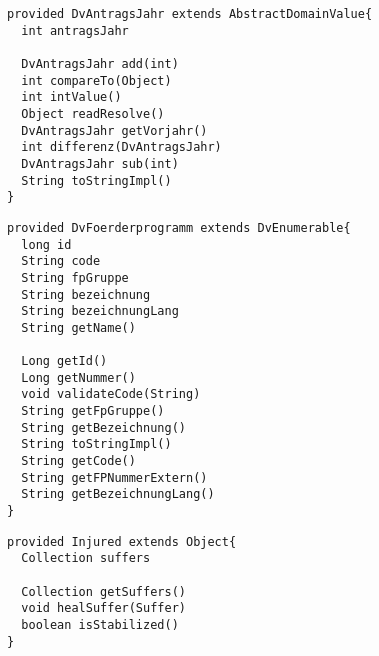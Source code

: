 \begin{lstlisting}[style = dsl, caption = Deklartion von DvAntragsJahr, captionpos = b, label = lst_dvantragsjahr]
provided DvAntragsJahr extends AbstractDomainValue{
  int antragsJahr
  
  DvAntragsJahr add(int)
  int compareTo(Object)
  int intValue()
  Object readResolve()
  DvAntragsJahr getVorjahr()
  int differenz(DvAntragsJahr)
  DvAntragsJahr sub(int)
  String toStringImpl()
}
\end{lstlisting}
\begin{lstlisting}[style = dsl, caption = Deklartion von DvFoerderprogramm, captionpos = b, label = lst_DvFoerderprogramm]
provided DvFoerderprogramm extends DvEnumerable{
  long id
  String code
  String fpGruppe
  String bezeichnung
  String bezeichnungLang
  String getName()
  
  Long getId()
  Long getNummer()
  void validateCode(String)
  String getFpGruppe()
  String getBezeichnung()
  String toStringImpl()
  String getCode()
  String getFPNummerExtern()
  String getBezeichnungLang()
}
\end{lstlisting}
\begin{lstlisting}[style = dsl, caption = Deklartion von Injured, captionpos = b, label = lst_Injured]
provided Injured extends Object{
  Collection suffers

  Collection getSuffers()
  void healSuffer(Suffer)
  boolean isStabilized()
}
\end{lstlisting}
